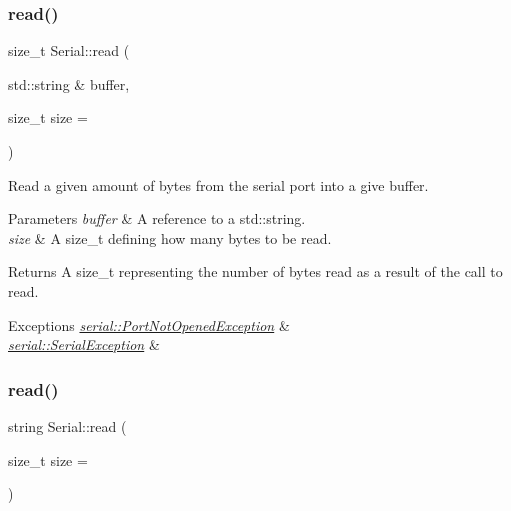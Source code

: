 \subsubsection{\texorpdfstring{read()}{read()}\hspace{0.1cm}{\footnotesize\ttfamily [3/4]}}
{\footnotesize\ttfamily size\+\_\+t Serial\+::read (\begin{DoxyParamCaption}\item[{std\+::string \&}]{buffer,  }\item[{size\+\_\+t}]{size = {} }\end{DoxyParamCaption})}

Read a given amount of bytes from the serial port into a give buffer.


\begin{DoxyParams}{Parameters}
{\em buffer} & A reference to a std\+::string. \\
\hline
{\em size} & A size\+\_\+t defining how many bytes to be read.\\
\hline
\end{DoxyParams}
\begin{DoxyReturn}{Returns}
A size\+\_\+t representing the number of bytes read as a result of the call to read.
\end{DoxyReturn}

\begin{DoxyExceptions}{Exceptions}
{\em \mbox{\hyperlink{classserial_1_1_port_not_opened_exception}{serial\+::\+Port\+Not\+Opened\+Exception}}} & \\
\hline
{\em \mbox{\hyperlink{classserial_1_1_serial_exception}{serial\+::\+Serial\+Exception}}} & \\
\hline
\end{DoxyExceptions}
\mbox{\label{classserial_1_1_serial_a6c71ad1cbacf86cead4d38b48c548405}} 
\subsubsection{\texorpdfstring{read()}{read()}\hspace{0.1cm}{\footnotesize\ttfamily [4/4]}}
{\footnotesize\ttfamily string Serial\+::read (\begin{DoxyParamCaption}\item[{size\+\_\+t}]{size = {} }\end{DoxyParamCaption})}

